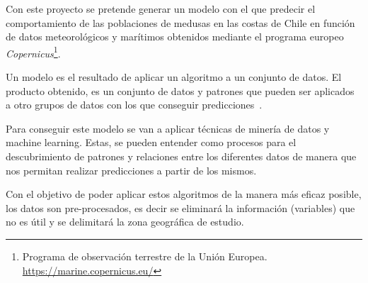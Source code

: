 Con este proyecto se pretende generar un modelo con el que predecir el comportamiento de las poblaciones de medusas en las costas de Chile en función de datos meteorológicos y marítimos obtenidos mediante el programa europeo \emph{Copernicus}\footnote{Programa de observación terrestre de la Unión Europea. \url{https://marine.copernicus.eu/}}. 

Un modelo es el resultado de aplicar un algoritmo a un conjunto de datos. El producto obtenido, es un conjunto de datos y patrones que pueden ser aplicados a otro grupos de datos con los que conseguir predicciones~\cite{modelo_definicion}.

Para conseguir este modelo se van a aplicar técnicas de minería de datos y machine learning. Estas, se pueden entender como procesos para el descubrimiento de patrones y relaciones entre los diferentes datos de manera que nos permitan realizar predicciones a partir de los mismos.

Con el objetivo de poder aplicar estos algoritmos de la manera más eficaz posible, los datos son pre-procesados, es decir se eliminará la información (variables) que no es útil y se delimitará la zona geográfica de estudio. 


